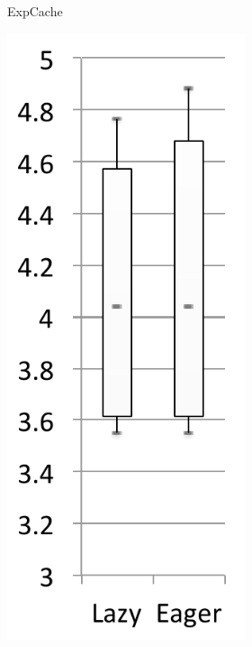\documentclass[sigplan,10pt,screen]{acmart}\settopmatter{printfolios=true,printccs=true,printacmref=true}
\begin{document}
\begin{figure}[bth]
\begin{subfigure}[b]{.48\textwidth}
\begin{subfigure}[b]{.24\textwidth}
		\caption{ExpCache}
	\end{subfigure}%
	\begin{subfigure}[b]{.24\textwidth}
		\includegraphics[width=\linewidth]{figures/netBeansRelease} 

\end{subfigure}
\end{subfigure}
\end{figure}
\end{document}
